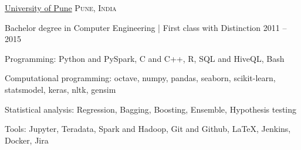 \documentclass[10pt,a4paper]{article}
\begin{document}
\spacedhrule{0.9em}{-0.4em}




\headedsection
  {\href{}{University of Pune}}
  {\textsc{Pune, India}} {%
  \headedsubsection
    {Bachelor degree in Computer Engineering | First class with Distinction}
    {2011 -- 2015}

}

\spacedhrule{0.9em}{-0.4em}



\inlineheadsection  %
 {Programming:}
{Python and PySpark, C and C++, R, SQL and HiveQL, Bash}
\vspace{0.5em}

\inlineheadsection
 {Computational programming:}
{octave, numpy, pandas, seaborn, scikit-learn, statsmodel, keras, nltk, gensim}
\vspace{0.5em}

\inlineheadsection
 {Statistical analysis:}
{Regression, Bagging, Boosting, Ensemble, Hypothesis testing}
\vspace{0.5em}

\inlineheadsection
  {Tools:}
  {Jupyter, Teradata, Spark and Hadoop, Git and Github, \LaTeX, Jenkins, Docker, Jira}
\end{document}

